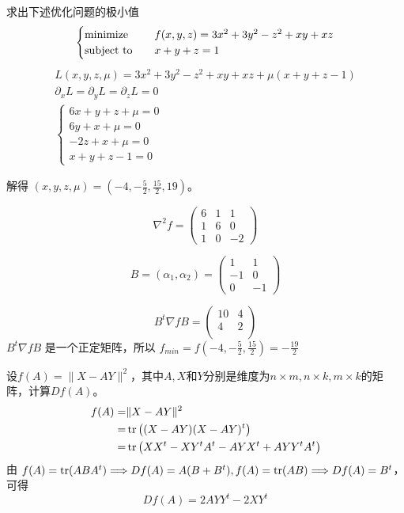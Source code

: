\begin{problem}
	求出下述优化问题的极小值\[\begin{cases}
		\operatorname{minimize}\quad & f(x, y, z)=3 x^{2}+3 y^{2}-z^{2}+x y+x z \\
		\operatorname{subject\ to}\quad & x+y+z=1
	\end{cases}\]
	\solution \begin{gather*}
		L(x, y, z, \mu) = 3x^2 + 3y^2 - z^2 + xy + xz + \mu(x + y + z - 1)\\
		\partial_xL = \partial_yL = \partial_zL = 0\\
		\begin{cases}
			6x + y + z + \mu = 0\\
			6y + x + \mu = 0\\
			-2z + x + \mu = 0\\
			x + y + z - 1 = 0
		\end{cases}
	\end{gather*}
	
	解得 $(x, y, z, \mu) = (-4, -\frac{5}{2}, \frac{15}{2}, 19)$。

	$$\nabla^2 f = \begin{pmatrix}
		6 & 1 & 1 \\
		1 & 6 & 0 \\
		1 & 0 & -2
	\end{pmatrix}$$

	$$B = (\alpha_1, \alpha_2) = \begin{pmatrix}
		1 & 1 \\
		-1 & 0 \\ 
		0 & -1
	\end{pmatrix}$$

	$$B^t\nabla f B = \begin{pmatrix}
		 10 & 4 \\ 
		 4 & 2 \\
	\end{pmatrix}$$
	$B^t\nabla f B$ 是一个正定矩阵，所以 $f_{min} = f(-4, -\frac{5}{2}, \frac{15}{2}) =  -\frac{19}{2}$
\end{problem}

\begin{problem}
	设$f(A)=\|X-AY\|^2$，其中$A,X$和$Y$分别是维度为$n\times m,n\times k,m\times k$的矩阵，计算$Df(A)$。
	\solution \begin{align*}
		f(A) =& \|X - AY\|^2 \\
		=& \tr\left((X - AY)(X - AY)^t\right) \\
		=& \tr\left(XX^t - XY^tA^t - AYX^t + AYY^tA^t\right)
	\end{align*}
	由 $f(A) = \tr(ABA^t) \Longrightarrow Df(A) = A(B + B^t), f(A) = \tr(AB) \Longrightarrow Df(A) = B^t$，可得 \[Df(A) = 2AYY^t - 2XY^t\]
\end{problem}

